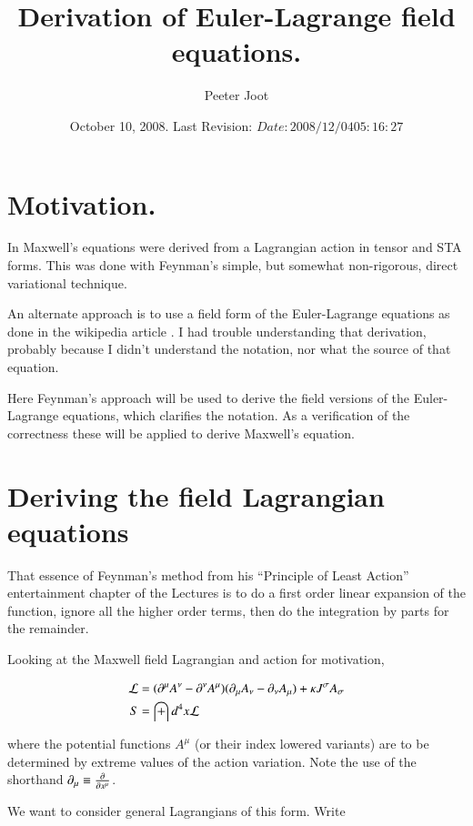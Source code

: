 \documentclass{article}
\title{ Derivation of Euler-Lagrange field equations.}
\author{Peeter Joot}
\date{ October 10, 2008.  Last Revision: $Date: 2008/12/04 05:16:27 $ }
\begin{document}
\maketitle{}

\tableofcontents

\section{ Motivation. }

In \cite{PJMaxwellLagrangian} Maxwell's equations were derived from
a Lagrangian action in tensor and STA forms.  This was done with 
Feynman's \cite{feynman1963flp} simple, but somewhat non-rigorous, direct variational technique.

An alternate approach is to use a field form of the Euler-Lagrange
equations as done in the wikipedia article \cite{wikiemtensor}.  I had
trouble understanding that derivation, probably because
I didn't understand the notation, nor what the source of that equation.

Here Feynman's approach will be used to derive the field versions of the Euler-Lagrange
equations, which clarifies the notation.  As a verification of the correctness these
will be applied to derive Maxwell's equation.

\section{ Deriving the field Lagrangian equations }

That essence of Feynman's method from his 
``Principle of Least Action'' entertainment chapter of the Lectures is
to do a first order linear expansion of the function, ignore all the higher order terms,
then do the integration by parts for the remainder.

Looking at the Maxwell field Lagrangian and action for motivation,

\begin{align*}
\mathcal{L} &= (\partial^\mu A^\nu - \partial^\nu A^\mu) (\partial_\mu A_\nu - \partial_\nu A_\mu) + \kappa J^\sigma A_\sigma \\
S &= \int d^4 x \mathcal{L}
\end{align*}

where the potential functions $A^\mu$ (or their index lowered variants)
are to be determined by extreme values of the action variation.  Note the use of the shorthand
$\partial_\mu \equiv \frac{\partial {}}{\partial {x^\mu}}$.

We want to consider general Lagrangians of this form.  Write
\end{document}
